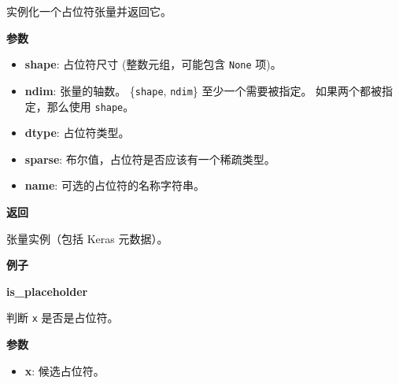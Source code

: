 实例化一个占位符张量并返回它。

\textbf{参数}

\begin{itemize}
\tightlist
\item
  \textbf{shape}: 占位符尺寸 (整数元组，可能包含 \texttt{None} 项)。
\item
  \textbf{ndim}: 张量的轴数。 \{\texttt{shape}, \texttt{ndim}\}
  至少一个需要被指定。 如果两个都被指定，那么使用 \texttt{shape}。
\item
  \textbf{dtype}: 占位符类型。
\item
  \textbf{sparse}: 布尔值，占位符是否应该有一个稀疏类型。
\item
  \textbf{name}: 可选的占位符的名称字符串。
\end{itemize}

\textbf{返回}

张量实例（包括 Keras 元数据）。

\textbf{例子}

\begin{Shaded}
\begin{Highlighting}[]
\OperatorTok{>>>}    
\OperatorTok{>>>} \OperatorTok{=} \OperatorTok{=}\NormalTok{(}\NormalTok{, }\NormalTok{, }\NormalTok{))}
\OperatorTok{>>>} 
\NormalTok{(}\NormalTok{, }\NormalTok{, }\NormalTok{)}
\OperatorTok{>>>} 
\OperatorTok{<} \OperatorTok{=}\NormalTok{(}\NormalTok{, }\NormalTok{, }\OperatorTok{=}\OperatorTok{>}
\end{Highlighting}
\end{Shaded}


\textbf{is\_placeholder}\label{isux5fplaceholder}

\begin{Shaded}
\begin{Highlighting}[]
\end{Highlighting}
\end{Shaded}

判断 \texttt{x} 是否是占位符。

\textbf{参数}

\begin{itemize}
\tightlist
\item
  \textbf{x}: 候选占位符。
\end{itemize}

